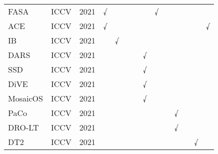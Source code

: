 \begin{table*}[htbp]
{\begin{tabular}{lccccccccccccc}
FASA \cite{Zang_2021}  & ICCV  & 2021  & √     &       &       &       &       & √     &       &       &       &       &  \\
ACE \cite{Cai_2021}  & ICCV  & 2021  & √     &       &       &       &       &       &       &       &       &       & √ \\
IB \cite{Park_2021}  & ICCV  & 2021  &       & √     &       &       &       &       &       &       &       &       &  \\
DARS \cite{He_2021_redis}  & ICCV  & 2021  &       &       &       &       & √     &       &       &       &       &       &  \\
SSD \cite{Li_2021_self}  & ICCV  & 2021  &       &       &       &       & √     &       &       &       &       &       &  \\
DiVE \cite{He_2021_dist}  & ICCV  & 2021  &       &       &       &       & √     &       &       &       &       &       &  \\
MosaicOS \cite{Zhang_2021_mosa}  & ICCV  & 2021  &       &       &       &       & √     &       &       &       &       &       &  \\
PaCo \cite{Cui_2021}  & ICCV  & 2021  &       &       &       &       &       &       &       & √     &       &       &  \\
DRO-LT \cite{Samuel_2021}  & ICCV  & 2021  &       &       &       &       &       &       &       & √     &       &       &  \\
DT2 \cite{Desai_2021}  & ICCV  & 2021  &       &       &       &       &       &       &       &       &       & √     &  \\
\bottomrule
\end{tabular}}%
\label{tab:2}%
\end{table*}%